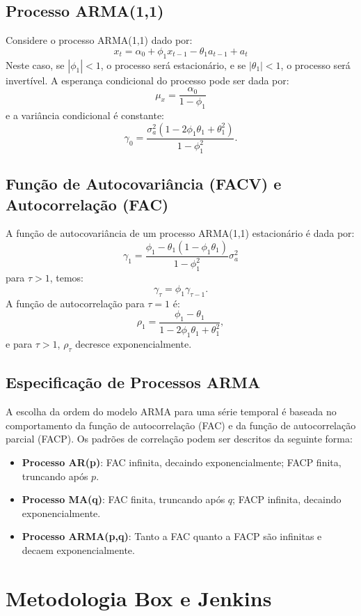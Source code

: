 \documentclass{sciposter}
\begin{document}
\begin{multicols}{3}
\subsection{Processo ARMA(1,1)}
Considere o processo ARMA(1,1) dado por:
\[
x_t = \alpha_0 + \phi_1 x_{t-1} - \theta_1 a_{t-1} + a_t
\]
Neste caso, se $|\phi_1| < 1$, o processo será estacionário, e se $|\theta_1| < 1$, o processo será invertível. A esperança condicional do processo pode ser dada por:
\[
\mu_x = \dfrac{\alpha_0}{1 - \phi_1}
\]
e a variância condicional é constante:
\[
\gamma_0 = \dfrac{\sigma_a^2 (1 - 2 \phi_1 \theta_1 + \theta_1^2)}{1 - \phi_1^2}.
\]

\subsection{Função de Autocovariância (FACV) e Autocorrelação (FAC)}
A função de autocovariância de um processo ARMA(1,1) estacionário é dada por:
\[
\gamma_1 = \dfrac{\phi_1 - \theta_1 (1 - \phi_1 \theta_1)}{1 - \phi_1^2} \sigma_a^2
\]
para $\tau > 1$, temos:
\[
\gamma_\tau = \phi_1 \gamma_{\tau-1}.
\]
A função de autocorrelação para $\tau = 1$ é:
\[
\rho_1 = \dfrac{\phi_1 - \theta_1}{1 - 2 \phi_1 \theta_1 + \theta_1^2},
\]
e para $\tau > 1$, $\rho_\tau$ decresce exponencialmente.

\subsection{Especificação de Processos ARMA}
A escolha da ordem do modelo ARMA para uma série temporal é baseada no comportamento da função de autocorrelação (FAC) e da função de autocorrelação parcial (FACP). Os padrões de correlação podem ser descritos da seguinte forma:
\begin{itemize}
    \item \textbf{Processo AR(p)}: FAC infinita, decaindo exponencialmente; FACP finita, truncando após $p$.
    \item \textbf{Processo MA(q)}: FAC finita, truncando após $q$; FACP infinita, decaindo exponencialmente.
    \item \textbf{Processo ARMA(p,q)}: Tanto a FAC quanto a FACP são infinitas e decaem exponencialmente.
\end{itemize}

\section{\textbf{Metodologia Box e Jenkins}}


\end{multicols}
\end{document}
